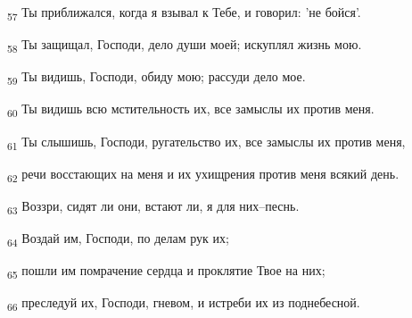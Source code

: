 \begin{tcolorbox}
\textsubscript{57} Ты приближался, когда я взывал к Тебе, и говорил: 'не бойся'.
\end{tcolorbox}
\begin{tcolorbox}
\textsubscript{58} Ты защищал, Господи, дело души моей; искуплял жизнь мою.
\end{tcolorbox}
\begin{tcolorbox}
\textsubscript{59} Ты видишь, Господи, обиду мою; рассуди дело мое.
\end{tcolorbox}
\begin{tcolorbox}
\textsubscript{60} Ты видишь всю мстительность их, все замыслы их против меня.
\end{tcolorbox}
\begin{tcolorbox}
\textsubscript{61} Ты слышишь, Господи, ругательство их, все замыслы их против меня,
\end{tcolorbox}
\begin{tcolorbox}
\textsubscript{62} речи восстающих на меня и их ухищрения против меня всякий день.
\end{tcolorbox}
\begin{tcolorbox}
\textsubscript{63} Воззри, сидят ли они, встают ли, я для них--песнь.
\end{tcolorbox}
\begin{tcolorbox}
\textsubscript{64} Воздай им, Господи, по делам рук их;
\end{tcolorbox}
\begin{tcolorbox}
\textsubscript{65} пошли им помрачение сердца и проклятие Твое на них;
\end{tcolorbox}
\begin{tcolorbox}
\textsubscript{66} преследуй их, Господи, гневом, и истреби их из поднебесной.
\end{tcolorbox}
